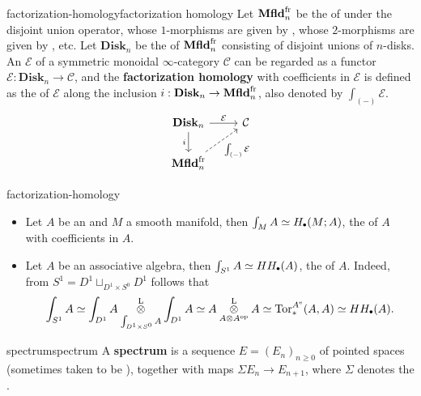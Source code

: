 \begin{topic}{factorization-homology}{factorization homology}
    Let $\textbf{Mfld}_n^\textup{fr}$ be the   of  under the disjoint union operator, whose $1$-morphisms are given by , whose $2$-morphisms are given by , etc. Let $\textbf{Disk}_n$ be the  of $\textbf{Mfld}_n^\textup{fr}$ consisting of disjoint unions of $n$-disks. An  $\mathcal{E}$ of a symmetric monoidal $\infty$-category $\mathcal{C}$ can be regarded as a functor $\mathcal{E} : \textbf{Disk}_n \to \mathcal{C}$, and the \textbf{factorization homology} with coefficients in $\mathcal{E}$ is defined as the  of $\mathcal{E}$ along the inclusion $i : \textbf{Disk}_n \to \textbf{Mfld}_n^\textup{fr}$, also denoted by $\int_{(-)} \mathcal{E}$.
    \[ \begin{tikzcd} \textbf{Disk}_n \arrow[swap]{d}{i} \arrow{r}{\mathcal{E}} & \mathcal{C} \\ \textbf{Mfld}_n^\textup{fr} \arrow[dashed, swap]{ur}{\int_{(-)} \mathcal{E}} \end{tikzcd} \]
\end{topic}

\begin{example}{factorization-homology}
    \begin{itemize}
        \item Let $A$ be an  and $M$ a smooth manifold, then $\int_M A \simeq H_\bdot(M; A)$, the  of $A$ with coefficients in $A$.
        \item Let $A$ be an associative algebra, then $\int_{S^1} A \simeq HH_\bdot(A)$, the  of $A$. Indeed, from $S^1 = D^1 \sqcup_{D^1 \times S^0} D^1$ follows that
        \[ \int_{S^1} A \simeq \int_{D^1} A \mathbin{\mathop{\overset{\textup{L}}{\otimes}}\limits_{\int_{D^1 \times S^0} A}} \int_{D^1} A \simeq A \mathbin{\mathop{\overset{\textup{L}}{\otimes}}\limits_{A \otimes A^\textup{op}}} A \simeq \textup{Tor}^{A^\textup{e}}_*(A, A) \simeq HH_\bdot(A) . \]
    \end{itemize}    
\end{example}

\begin{topic}{spectrum}{spectrum}
    A \textbf{spectrum} is a sequence $E = (E_n)_{n \ge 0}$ of pointed spaces (sometimes taken to be ), together with maps $\Sigma E_n \to E_{n + 1}$, where $\Sigma$ denotes the .
\end{topic}

